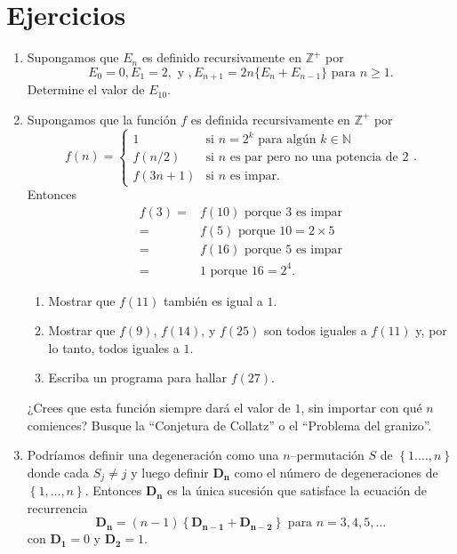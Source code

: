 \section{Ejercicios}
\begin{enumerate}
	\item Supongamos que $E_n$ es definido recursivamente en $\mathds{Z}^+$ por \[ E_0=0,E_1=2,\text{ y },E_{n+1}=2n\{E_n+E_{n-1}\} \text{ para }n\geq 1. \] Determine el valor de $E_{10}$.
	\item Supongamos que la función $f$ es definida recursivamente en $\mathds{Z}^+$ por \[ f(n)=\begin{cases}1 & \text{si }n=2^k\text{ para algún }k \in \mathds{N}\\ f(n/2) & \text{si }n\text{ es par pero no una potencia de 2} \\ f(3n+1) & \text{si }n\text{ es impar.}\end{cases}. \] Entonces 
		\begin{align*}
		f(3)=&f(10)\text{ porque }3\text{ es impar}\\
				=&f(5)\text{ porque } 10=2\times 5\\
				=&f(16)\text{ porque }5\text{ es impar}\\
				=&1\text{ porque } 16=2^4.
		\end{align*}
		\begin{enumerate}
	    \item Mostrar que $f(11)$ también es igual a $1$.
	    \item Mostrar que $f(9)$, $f(14)$, y $f(25)$ son todos iguales a $f(11)$ y, por lo tanto, todos iguales a $1$.
	    \item Escriba un programa para hallar $f(27)$.
		\end{enumerate}
	¿Crees que esta función siempre dará el valor de $1$, sin importar con qué $n$ comiences? Busque la ``Conjetura de Collatz'' o el ``Problema del granizo''.
	\item Podríamos definir una degeneración como una $n$--permutación $S$ de $\left\{1.\ldots,n\right\}$ donde cada $S_j\neq j$ y luego definir $\bm{D_n}$ como el número de degeneraciones de $\left\{1,\ldots,n\right\}$. Entonces $\bm{D_n}$ es la única sucesión que satisface la ecuación de recurrencia
		\begin{equation}\label{eq1}
			\bm{D_n}=\left(n-1\right)\left\{\bm{D_{n-1}}+\bm{D_{n-2}}\right\}\text{ para }n=3,4,5,\ldots
    \end{equation}
    con $\bm{D_1}=0$ y $\bm{D_2}=1$.
			\begin{enumerate}

\end{enumerate}
\end{enumerate}
